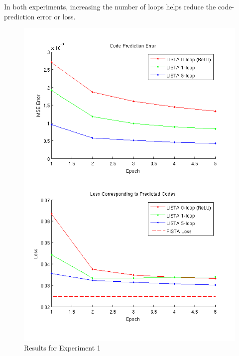 \documentclass[12pt,a4paper]{report}
\begin{document}
In both experiments, increasing the number of loops helps reduce the code-prediction error or loss.  
\begin{figure}
	\begin{center}
	\includegraphics[scale=0.75]{code_pred.png}
	\end{center}
\caption{Results for Experiment 1}
\end{figure} 
\end{document}
